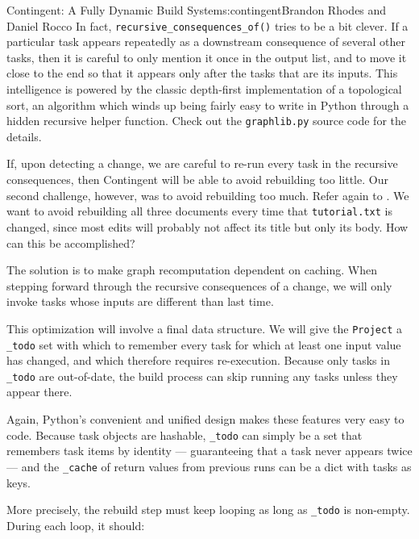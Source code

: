 \begin{aosachapter}{Contingent: A Fully Dynamic Build System}{s:contingent}{Brandon Rhodes and Daniel Rocco}
In fact, \texttt{recursive\_consequences\_of()} tries to be a bit
clever. If a particular task appears repeatedly as a downstream
consequence of several other tasks, then it is careful to only mention
it once in the output list, and to move it close to the end so that it
appears only after the tasks that are its inputs. This intelligence is
powered by the classic depth-first implementation of a topological sort,
an algorithm which winds up being fairly easy to write in Python through
a hidden recursive helper function. Check out the \texttt{graphlib.py}
source code for the details.

If, upon detecting a change, we are careful to re-run every task in the
recursive consequences, then Contingent will be able to avoid rebuilding
too little. Our second challenge, however, was to avoid rebuilding too
much. Refer again to . We want to
avoid rebuilding all three documents every time that
\texttt{tutorial.txt} is changed, since most edits will probably not
affect its title but only its body. How can this be accomplished?

The solution is to make graph recomputation dependent on caching. When
stepping forward through the recursive consequences of a change, we will
only invoke tasks whose inputs are different than last time.

This optimization will involve a final data structure. We will give the
\texttt{Project} a \texttt{\_todo} set with which to remember every task
for which at least one input value has changed, and which therefore
requires re-execution. Because only tasks in \texttt{\_todo} are
out-of-date, the build process can skip running any tasks unless they
appear there.

Again, Python's convenient and unified design makes these features very
easy to code. Because task objects are hashable, \texttt{\_todo} can
simply be a set that remembers task items by identity --- guaranteeing
that a task never appears twice --- and the \texttt{\_cache} of return
values from previous runs can be a dict with tasks as keys.

More precisely, the rebuild step must keep looping as long as
\texttt{\_todo} is non-empty. During each loop, it should:


\end{aosachapter}

